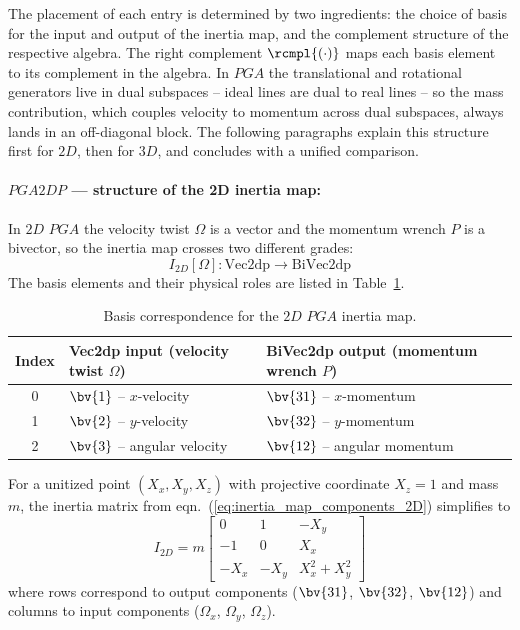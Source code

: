 The placement of each entry is determined by two ingredients: the choice of basis for the
input and output of the inertia map, and the complement structure of the respective
algebra. The right complement $\rcmpl{(\cdot)}$ maps each basis element to its complement
in the algebra. In $PGA$ the translational and rotational generators live in dual
subspaces -- ideal lines are dual to real lines -- so the mass contribution, which couples
velocity to momentum across dual subspaces, always lands in an off-diagonal block. The
following paragraphs explain this structure first for $2D$, then for $3D$, and concludes
with a unified comparison.

\paragraph{$PGA2DP$ --- structure of the 2D inertia map:}
In $2D$ $PGA$ the velocity twist $\Omega$ is a vector and the momentum wrench $P$ is a
bivector, so the inertia map crosses two different grades:
\begin{equation}
    I_{2D}[\Omega] : \mathrm{Vec2dp} \to \mathrm{BiVec2dp}
\end{equation}
The basis elements and their physical roles are listed in Table~\ref{tab:basis_pga2dp}.

\begin{table}[!ht]
\centering\small
\begin{tabular}{c|p{5.2cm}|p{5.2cm}}
\hline
Index & Vec2dp input (velocity twist $\Omega$) & BiVec2dp output (momentum wrench $P$) \\
\hline
0 & $\bv{1}$ -- $x$-velocity & $\bv{31}$ -- $x$-momentum \\
1 & $\bv{2}$ -- $y$-velocity & $\bv{32}$ -- $y$-momentum \\
2 & $\bv{3}$ -- angular velocity  & $\bv{12}$ -- angular momentum \\
\hline
\end{tabular}
\caption{Basis correspondence for the $2D$ $PGA$ inertia map.}
\label{tab:basis_pga2dp}
\end{table}

For a unitized point $(X_x, X_y, X_z)$ with projective coordinate $X_z = 1$ and mass $m$,
the inertia matrix from eqn.~(\ref{eq:inertia_map_components_2D}) simplifies to
\begin{equation}
    I_{2D} = m
    \begin{bmatrix}
        0    &  1   & -X_y           \\
        -1   &  0   &  X_x           \\
        -X_x & -X_y & X_x^2 + X_y^2
    \end{bmatrix}
    \label{eq:inertia_2D_unitized}
\end{equation}
where rows correspond to output components ($\bv{31}$, $\bv{32}$, $\bv{12}$) and columns
to input components ($\Omega_x$, $\Omega_y$, $\Omega_z$).

